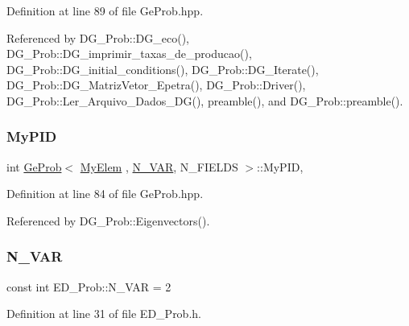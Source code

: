 Definition at line 89 of file Ge\+Prob.\+hpp.



Referenced by D\+G\+\_\+\+Prob\+::\+D\+G\+\_\+eco(), D\+G\+\_\+\+Prob\+::\+D\+G\+\_\+imprimir\+\_\+taxas\+\_\+de\+\_\+producao(), D\+G\+\_\+\+Prob\+::\+D\+G\+\_\+initial\+\_\+conditions(), D\+G\+\_\+\+Prob\+::\+D\+G\+\_\+\+Iterate(), D\+G\+\_\+\+Prob\+::\+D\+G\+\_\+\+Matriz\+Vetor\+\_\+\+Epetra(), D\+G\+\_\+\+Prob\+::\+Driver(), D\+G\+\_\+\+Prob\+::\+Ler\+\_\+\+Arquivo\+\_\+\+Dados\+\_\+\+D\+G(), preamble(), and D\+G\+\_\+\+Prob\+::preamble().

\mbox{\label{classGeProb_a646b814acd21db4a20bbbd9fe159da3f}} 
\subsubsection{\texorpdfstring{My\+P\+ID}{MyPID}}
{\footnotesize\ttfamily int \hyperlink{classGeProb}{Ge\+Prob}$<$ \hyperlink{DG__Prob_8h_a83cd887ced9a6587428f267e50cd4787}{My\+Elem} , \hyperlink{classED__Prob_a4e7d2ff1a8e435e336fb00c527224b5a}{N\+\_\+\+V\+AR}, N\+\_\+\+F\+I\+E\+L\+DS $>$\+::My\+P\+ID\hspace{0.3cm}{\ttfamily [protected]}, {\ttfamily [inherited]}}



Definition at line 84 of file Ge\+Prob.\+hpp.



Referenced by D\+G\+\_\+\+Prob\+::\+Eigenvectors().

\mbox{\label{classED__Prob_a4e7d2ff1a8e435e336fb00c527224b5a}} 
\subsubsection{\texorpdfstring{N\+\_\+\+V\+AR}{N\_VAR}}
{\footnotesize\ttfamily const int E\+D\+\_\+\+Prob\+::\+N\+\_\+\+V\+AR = 2\hspace{0.3cm}{\ttfamily [private]}}



Definition at line 31 of file E\+D\+\_\+\+Prob.\+h.



